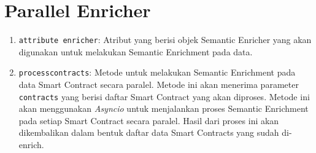\chapter{Parallel Enricher}
\label{appendix:parallel-enricher}

\begin{enumerate}
	\item \texttt{attribute enricher}: Atribut yang berisi objek Semantic Enricher yang akan digunakan untuk melakukan Semantic Enrichment pada data.
	\item \texttt{process\textunderscore contracts}: Metode untuk melakukan Semantic Enrichment pada data Smart Contract secara paralel. Metode ini akan menerima parameter \texttt{contracts} yang berisi daftar Smart Contract yang akan diproses. Metode ini akan menggunakan \textit{Asyncio} untuk menjalankan proses Semantic Enrichment pada setiap Smart Contract secara paralel. Hasil dari proses ini akan dikembalikan dalam bentuk daftar data Smart Contracts yang sudah di-enrich.
\end{enumerate}
